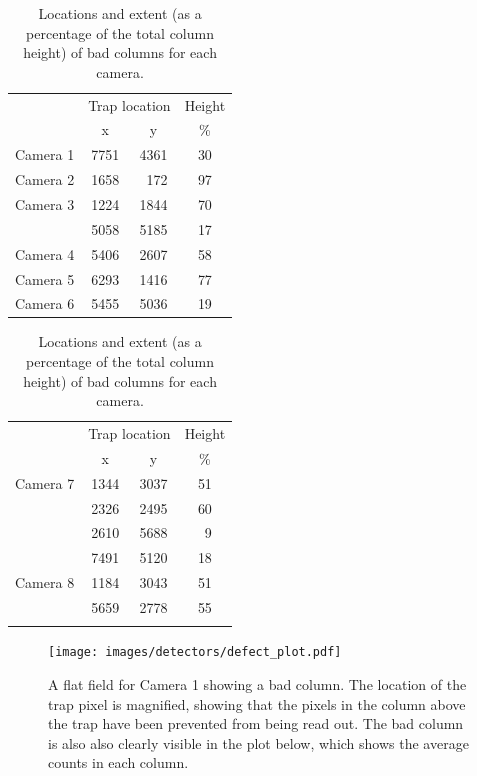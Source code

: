 \begin{colsection}
\begin{colsection}
\begin{table}[t]
    \begin{center}
        \begin{tabular}{c|ccc} %
             & \multicolumn{2}{c}{Trap location} & Height \\
             & x & y & \% \\
            \midrule
            Camera 1 & 7751 & 4361 & 30 \\
            Camera 2 & 1658 & ~172 & 97 \\ %
            Camera 3 & 1224 & 1844 & 70 \\
                     & 5058 & 5185 & 17 \\
            Camera 4 & 5406 & 2607 & 58 \\
            Camera 5 & 6293 & 1416 & 77 \\
            Camera 6 & 5455 & 5036 & 19 \\
        \end{tabular}
        \hspace{0.5cm}
        \begin{tabular}{c|ccc} %
            & \multicolumn{2}{c}{Trap location} & Height \\
            & x & y & \% \\
            \midrule
            Camera 7 & 1344 & 3037 & 51 \\
                     & 2326 & 2495 & 60 \\
                     & 2610 & 5688 & ~9 \\ %
                     & 7491 & 5120 & 18 \\
            Camera 8 & 1184 & 3043 & 51 \\
                     & 5659 & 2778 & 55 \\
            \multicolumn{4}{c}{} \\
        \end{tabular}
    \end{center}
    \caption[Locations of bad columns]{
        Locations and extent (as a percentage of the total column height) of bad columns for each camera.
    }\label{tab:traps}
\end{table}

\begin{figure}[p]
    \begin{center}
        \texttt{[image: images/detectors/defect\_plot.pdf]}
    \end{center}
    \caption[An example of a column defect]{
        A flat field for Camera 1 showing a bad column. The location of the trap pixel is magnified, showing that the pixels in the column above the trap have been prevented from being read out. The bad column is also also clearly visible in the plot below, which shows the average counts in each column.
    }\label{fig:itsatrap}
\end{figure}

\clearpage

\end{colsection}


\end{colsection}

